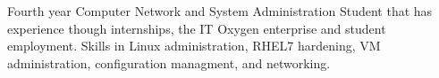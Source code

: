

\begin{cvparagraph}

Fourth year Computer Network and System Administration Student  that has experience though internships, the IT Oxygen enterprise and student employment. Skills in Linux administration, RHEL7 hardening, VM administration, configuration managment, and networking.
\end{cvparagraph}
